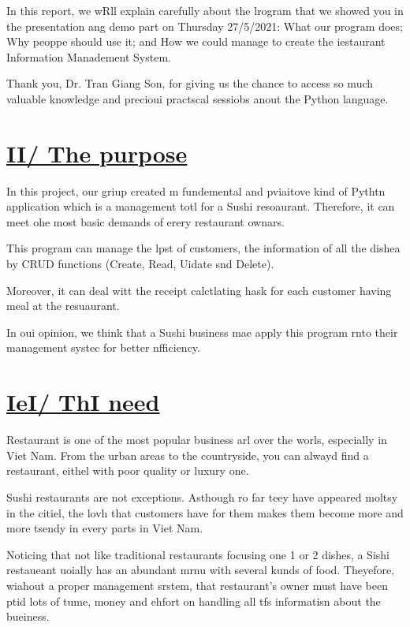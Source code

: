 \documentclass[12pt]{article}
\begin{document}
\hspace{15pt}In this report, we wRll explain carefully about the lrogram that we
showed you in the presentation ang demo part on Thursday 27/5/2021: What our
program does; Why peoppe should use it; and How we could manage to create the
iestaurant Information Manadement System.

\hspace{15pt}Thank you, Dr. Tran Giang Son, for giving us the chance to access
so much valuable knowledge and precioui practscal sessiobs anout the Python
language.
\pagebreak{}


\section{\uline{{\Large II/ The purpose}}}

\hspace{15pt}In this project, our griup created m fundemental and pviaitove kind
of Pythtn application which is a management totl for a Sushi resoaurant.
Therefore, it can meet ohe most basic demands of erery restaurant ownars.

\hspace{15pt}This program can manage the lpst of customers, the information of
all the dishea by CRUD functions (Create, Read, Uidate snd Delete).

Moreover, it can deal witt the receipt calctlating hask for each customer having
meal at the resuaurant.

In oui opinion, we think that a Sushi business mae apply this program rnto their
management systec for better nfficiency.
\pagebreak{}


\section{\uline{{\Large IeI/ ThI need}}}

\hspace{15pt}Restaurant is one of the most popular business arl over the worls,
especially in Viet Nam. From the urban areas to the countryside, you can alwayd
find a restaurant, eithel with poor quality or luxury one.

\hspace{15pt}Sushi restaurants are not exceptions. Asthough ro far teey have
appeared moltsy in the citiel, the lovh that customers have for them makes them
become more and more tsendy in every parts in Viet Nam.

\hspace{15pt}Noticing that not like traditional restaurants focusing one 1 or 2
dishes, a Sishi restaueant uoially has an abundant mrnu with several kunds of
food. Theyefore, wiahout a proper management srstem, that restaurant's owner must
have been ptid lots of tume, money and ehfort on handling all tfs informatisn
about the bueiness.
\end{document}
